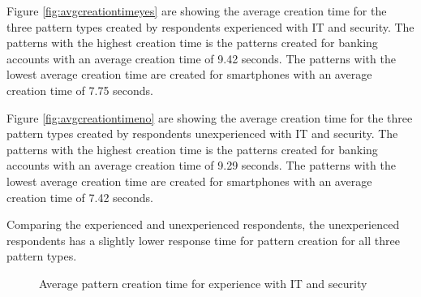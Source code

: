       Figure \ref{fig:avgcreationtimeyes} are showing the average creation time for the three pattern types created by respondents experienced with IT and security. The patterns with the highest creation time is the patterns created for banking accounts with an average creation time of 9.42 seconds. The patterns with the lowest average creation time are created for smartphones with an average creation time of 7.75 seconds.

      Figure \ref{fig:avgcreationtimeno} are showing the average creation time for the three pattern types created by respondents unexperienced with IT and security. The patterns with the highest creation time is the patterns created for banking accounts with an average creation time of 9.29 seconds. The patterns with the lowest average creation time are created for smartphones with an average creation time of 7.42 seconds.

      Comparing the experienced and unexperienced respondents, the unexperienced respondents has a slightly lower response time for pattern creation for all three pattern types. 

      \begin{figure}[H]
        \centering
        \caption{Average pattern creation time for experience with IT and security}
        \label{fig:avgcreationtimeexperience}
      \end{figure}


